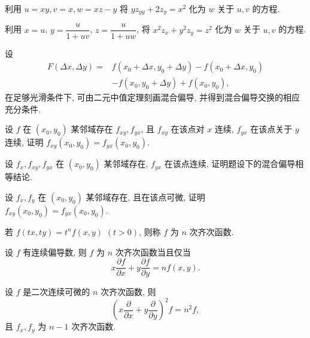 \documentclass[../../数学分析培优讲义.tex]{subfiles}
\begin{document}
\begin{example}
利用 $u=xy,v=x,w=xz-y$ 将 $yz_{yy}+2z_y=x^2$ 化为 $w$ 关于 $u,v$ 的方程.
\end{example}
\exampleblank

\begin{example}
利用 $x=u$, $\displaystyle y=\dfrac{u}{1+uv}$, $\displaystyle z=\dfrac{u}{1+uw}$, 将 $x^2z_x+y^2z_y=z^2$ 化为 $w$ 关于 $u,v$ 的方程.
\end{example}
\exampleblank

\begin{proposition}[\markstar]
设
\[
\begin{aligned}
F(\Delta x,\Delta y)={}&f(x_0+\Delta x,y_0+\Delta y)-f(x_0+\Delta x,y_0)\\
&-f(x_0,y_0+\Delta y)+f(x_0,y_0),
\end{aligned}
\]
在足够光滑条件下, 可由二元中值定理刻画混合偏导, 并得到混合偏导交换的相应充分条件.
\end{proposition}

\begin{example}
设 $f$ 在 $(x_0,y_0)$ 某邻域存在 $f_{xy},f_{yx}$, 且 $f_{xy}$ 在该点对 $x$ 连续, $f_{yx}$ 在该点关于 $y$ 连续, 证明 $f_{xy}(x_0,y_0)=f_{yx}(x_0,y_0)$.
\end{example}
\exampleblank

\begin{example}
设 $f_x,f_{xy},f_{yx}$ 在 $(x_0,y_0)$ 某邻域存在, $f_{yx}$ 在该点连续, 证明题设下的混合偏导相等结论.
\end{example}
\exampleblank

\begin{example}
设 $f_x,f_y$ 在 $(x_0,y_0)$ 某邻域存在, 且在该点可微, 证明 $f_{xy}(x_0,y_0)=f_{yx}(x_0,y_0)$.
\end{example}
\exampleblank

\begin{definition}
若 $f(tx,ty)=t^nf(x,y)$ $(t>0)$, 则称 $f$ 为 $n$ 次齐次函数.
\end{definition}

\begin{proposition}[\markstar]
设 $f$ 有连续偏导数, 则 $f$ 为 $n$ 次齐次函数当且仅当
\[
    x\dfrac{\partial f}{\partial x}+y\dfrac{\partial f}{\partial y}=nf(x,y).
\]
\end{proposition}

\begin{proposition}[\markstar]
设 $f$ 是二次连续可微的 $n$ 次齐次函数, 则
\[
    \left(x\dfrac{\partial}{\partial x}+y\dfrac{\partial}{\partial y}\right)^2f=n^2f,
\]
且 $f_x,f_y$ 为 $n-1$ 次齐次函数.
\end{proposition}
\end{document}
